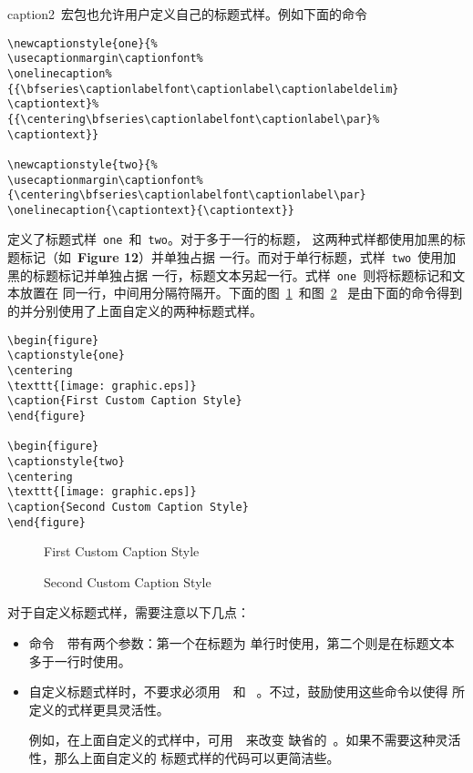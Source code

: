 \textsf{caption2}~宏包也允许用户定义自己的标题式样。例如下面的命令
\begin{Verbatim}[xleftmargin=1cm]
\newcaptionstyle{one}{% 
\usecaptionmargin\captionfont% 
\onelinecaption% 
{{\bfseries\captionlabelfont\captionlabel\captionlabeldelim} 
\captiontext}% 
{{\centering\bfseries\captionlabelfont\captionlabel\par}%
\captiontext}} 

\newcaptionstyle{two}{% 
\usecaptionmargin\captionfont% 
{\centering\bfseries\captionlabelfont\captionlabel\par} 
\onelinecaption{\captiontext}{\captiontext}}
\end{Verbatim}
定义了标题式样~\texttt{one}~和~\texttt{two}。对于多于一行的标题，
这两种式样都使用加黑的标题标记（如~\textbf{Figure 12}）并单独占据
一行。而对于单行标题，式样~\texttt{two}~使用加黑的标题标记并单独占据
一行，标题文本另起一行。式样~\texttt{one}~则将标题标记和文本放置在
同一行，中间用分隔符隔开。下面的图~\ref{fig:caption-1}~和图~\ref{fig:caption-2}
~是由下面的命令得到的并分别使用了上面自定义的两种标题式样。
\begin{Verbatim}[xleftmargin=1cm]
\begin{figure} 
\captionstyle{one} 
\centering 
\texttt{[image: graphic.eps]} 
\caption{First Custom Caption Style} 
\end{figure} 

\begin{figure} 
\captionstyle{two} 
\centering 
\texttt{[image: graphic.eps]} 
\caption{Second Custom Caption Style} 
\end{figure}
\end{Verbatim}

\begin{figure} 
	\centering 
	\resizebox{2in}{!}{\usebox{\graphic}}
	\caption{First Custom Caption Style}\label{fig:caption-1} 
\end{figure} 

\begin{figure} 
	\centering 
	\resizebox{2in}{!}{\usebox{\graphic}}
	\caption{Second Custom Caption Style}\label{fig:caption-2} 
\end{figure}

对于自定义标题式样，需要注意以下几点：
\begin{itemize}
	\item 命令~~带有两个参数：第一个在标题为
	单行时使用，第二个则是在标题文本多于一行时使用。
	\item 自定义标题式样时，不要求必须用~~和
	~。不过，鼓励使用这些命令以使得
	所定义的式样更具灵活性。
	
	例如，在上面自定义的式样中，可用~~来改变
	缺省的~。如果不需要这种灵活性，那么上面自定义的
	标题式样的代码可以更简洁些。
\end{itemize}

